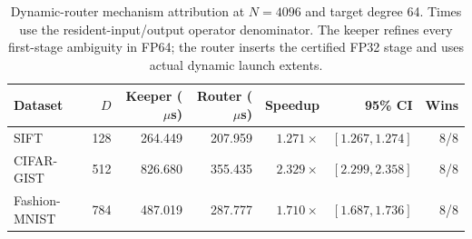 \begin{table}[t]
  \centering
  \caption{Dynamic-router mechanism attribution at $N=4096$ and target degree
  64.  Times use the resident-input/output operator denominator.  The keeper
  refines every first-stage ambiguity in FP64; the router inserts the certified
  FP32 stage and uses actual dynamic launch extents.}
  \label{tab:router}
  \small
  \begin{tabular}{lrrrrrr}
    \toprule
    Dataset & $D$ & Keeper ($\mu$s) & Router ($\mu$s) & Speedup & 95\% CI & Wins \\
    \midrule
    SIFT & 128 & 264.449 & 207.959 & $1.271\times$ & $[1.267,1.274]$ & 8/8 \\
    CIFAR-GIST & 512 & 826.680 & 355.435 & $2.329\times$ & $[2.299,2.358]$ & 8/8 \\
    Fashion-MNIST & 784 & 487.019 & 287.777 & $1.710\times$ & $[1.687,1.736]$ & 8/8 \\
    \bottomrule
  \end{tabular}
\end{table}

